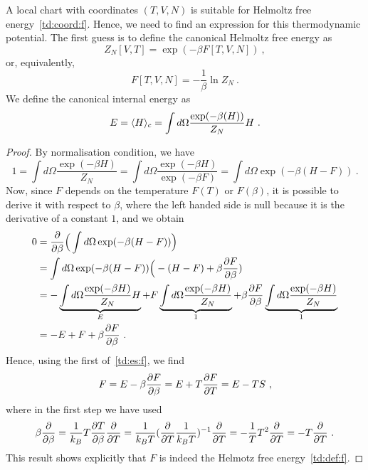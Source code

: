     A local chart with coordinates $(T, V, N)$ is suitable for Helmoltz free energy~\eqref{td:coord:f}. Hence, we need to find an expression for this thermodynamic potential. The first guess is to define the canonical Helmoltz free energy as 
    \begin{equation}\label{c:zf}
        Z_N [V, T] = \exp(-\beta F[T, V, N]) ~,
    \end{equation}
    or, equivalently,
    \begin{equation}\label{c:f}
        F[T, V, N] = -\frac{1}{\beta} \ln Z_N ~.
    \end{equation}
    We define the canonical internal energy as
    \begin{equation}\label{c:e}
        E = \langle H\rangle_{c} = \int d\Omega \frac{\exp(-\beta (H))}{Z_N} H ~.
    \end{equation}
    \begin{proof}
        By normalisation condition, we have
        \begin{equation*}
            1 = \int d\Omega \frac{\exp(-\beta H)}{Z_N} = \int d\Omega \frac{\exp(-\beta H)}{\exp(-\beta F)} = \int d\Omega \exp (- \beta (H - F)) ~.
        \end{equation*}
        Now, since $F$ depends on the temperature $F(T)$ or $F(\beta)$, it is possible to derive it with respect to $\beta$, where the left handed side is null because it is the derivative of a constant $1$, and we obtain
        \begin{equation*}
        \begin{aligned}
            0 & = \frac{\partial}{\partial\beta} \Big ( \int d\Omega \exp (- \beta (H - F)) \Big) \\ & = \int d\Omega \exp (-\beta (H - F)) \Big (-(H - F) + \beta \frac{\partial F}{\partial\beta}) \\ & = - \underbrace{\int d\Omega \frac{\exp(-\beta H)}{Z_N} H}_{E} + F \underbrace{\int d\Omega \frac{\exp(-\beta H)}{Z_N}}_{1} + \beta \frac{\partial F}{\partial\beta} \underbrace{\int d\Omega \frac{\exp(-\beta H)}{Z_N}}_{1} \\ & = - E + F + \beta \frac{\partial F}{\partial\beta} ~.
        \end{aligned}
        \end{equation*}
        Hence, using the first of~\eqref{td:es:f}, we find
        \begin{equation*}
            F = E - \beta \frac{\partial F}{\partial\beta} = E + T \frac{\partial F}{\partial T} = E - TS ~,
        \end{equation*}
        where in the first step we have used 
        \begin{equation*}
            \beta \frac{\partial}{\partial\beta} = \frac{1}{k_B} T \frac{\partial T}{\partial\beta} \frac{\partial}{\partial T} = \frac{1}{k_B T} (\frac{\partial}{\partial T} \frac{1}{k_B T})^{-1} \frac{\partial}{\partial T} = - \frac{1}{T} T^2 \frac{\partial}{\partial T} = - T \frac{\partial}{\partial T} ~.
        \end{equation*}
        This result shows explicitly that $F$ is indeed the Helmotz free energy~\eqref{td:def:f}.
    \end{proof}
